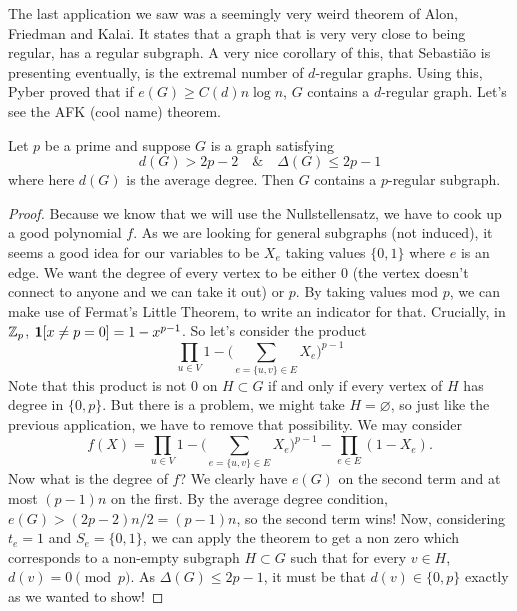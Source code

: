 The last application we saw was a seemingly very weird theorem of
Alon, Friedman and Kalai.
It states that a graph that is very very close to being regular, has
a regular subgraph.
A very nice corollary of this, that Sebastião is presenting
eventually, is the extremal
number of $d$-regular graphs. Using this, Pyber proved that if $e(G)
\geq C(d) n \log n$,
$G$ contains a $d$-regular graph. Let's see the AFK (cool name) theorem.

\begin{theorem} [AFK]
	Let $p$ be a prime and suppose $G$ is a graph satisfying
	\[
		d(G) > 2p - 2 \quad \& \quad \Delta(G) \leq 2p - 1
	\]
	where here $d(G)$ is the average degree. Then $G$ contains
	a $p$-regular subgraph.
\end{theorem}

\begin{proof}
	Because we know that we will use the Nullstellensatz, we have
	to cook up a good polynomial $f$. As we are looking for general subgraphs
	(not induced), it seems a good idea for our variables to be $X_e$
	taking values $\{0,1\}$
	where $e$ is an edge. We want the degree of every vertex to be
	either $0$ (the vertex doesn't connect
	to anyone and we can take it out) or $p$.
	By taking values mod $p$, we can make use of Fermat's
	Little Theorem, to write an indicator for that. Crucially, in $\mathbb{Z}_p$,
 $\bm{1}[x \neq p = 0] = 1 - x^{p-1}$.
	So let's consider the product
	\[
		\prod_{u \in V} 1 - \bigg(\sum_{e = \{u,v\} \in E} X_e \bigg)^{p-1}
	\]
	Note that this product is not $0$ on $H \subset G$ if and only if
	every vertex of $H$ has degree in $\{0,p\}$. But there is a problem,
	we might take $H = \varnothing$, so just like the previous application,
	we have to remove that possibility. We may consider
	\[
		f(X) = \prod_{u \in V} 1 - \bigg(\sum_{e = \{u,v\} \in E} X_e \bigg)^{p-1}
		- \prod_{e \in E} (1 - X_e).
	\]
	Now what is the degree of $f$? We clearly have $e(G)$ on the second term
	and at most $(p-1)n$ on the first. By the average degree condition,
	$e(G) > (2p-2)n/2 = (p-1)n$, so the second term wins! Now,
	considering $t_e = 1$
	and $S_e = \{0,1\}$, we can apply the theorem to get a non zero
	which corresponds
	to a non-empty subgraph $H \subset G$ such that for every $v \in H$,
	$d(v) = 0 \pmod p$.
	As $\Delta(G) \leq 2p - 1$, it must be that $d(v) \in \{0,p\}$ exactly as we
	wanted to show!
\end{proof}

